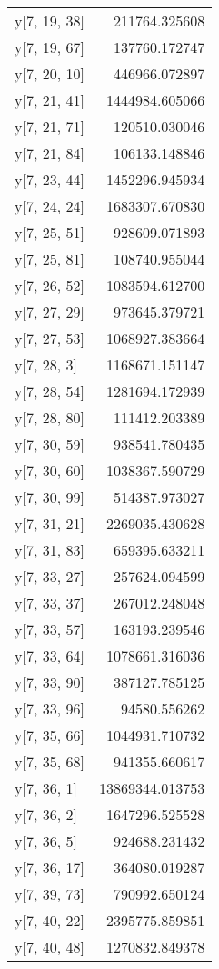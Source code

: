 \begin{longtable}{lr}
y[7, 19, 38] & 211764.325608 \\
y[7, 19, 67] & 137760.172747 \\
y[7, 20, 10] & 446966.072897 \\
y[7, 21, 41] & 1444984.605066 \\
y[7, 21, 71] & 120510.030046 \\
y[7, 21, 84] & 106133.148846 \\
y[7, 23, 44] & 1452296.945934 \\
y[7, 24, 24] & 1683307.670830 \\
y[7, 25, 51] & 928609.071893 \\
y[7, 25, 81] & 108740.955044 \\
y[7, 26, 52] & 1083594.612700 \\
y[7, 27, 29] & 973645.379721 \\
y[7, 27, 53] & 1068927.383664 \\
y[7, 28, 3] & 1168671.151147 \\
y[7, 28, 54] & 1281694.172939 \\
y[7, 28, 80] & 111412.203389 \\
y[7, 30, 59] & 938541.780435 \\
y[7, 30, 60] & 1038367.590729 \\
y[7, 30, 99] & 514387.973027 \\
y[7, 31, 21] & 2269035.430628 \\
y[7, 31, 83] & 659395.633211 \\
y[7, 33, 27] & 257624.094599 \\
y[7, 33, 37] & 267012.248048 \\
y[7, 33, 57] & 163193.239546 \\
y[7, 33, 64] & 1078661.316036 \\
y[7, 33, 90] & 387127.785125 \\
y[7, 33, 96] & 94580.556262 \\
y[7, 35, 66] & 1044931.710732 \\
y[7, 35, 68] & 941355.660617 \\
y[7, 36, 1] & 13869344.013753 \\
y[7, 36, 2] & 1647296.525528 \\
y[7, 36, 5] & 924688.231432 \\
y[7, 36, 17] & 364080.019287 \\
y[7, 39, 73] & 790992.650124 \\
y[7, 40, 22] & 2395775.859851 \\
y[7, 40, 48] & 1270832.849378 \\

\end{longtable}

